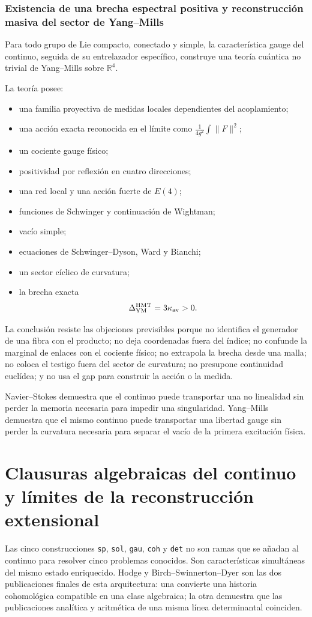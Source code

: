 \subsubsection{Existencia de una brecha espectral positiva y reconstrucción masiva del sector de Yang–Mills}
Para todo grupo de Lie compacto, conectado y simple, la característica gauge
del continuo, seguida de su entrelazador específico, construye una teoría
cuántica no trivial de Yang--Mills sobre \(\mathbb R^4\).\par
La teoría posee:\par
\begin{itemize}
\item una familia proyectiva de medidas locales dependientes del acoplamiento;
\item una acción exacta reconocida en el límite como \(\frac1{4g^2}\int\|F\|^2\);
\item un cociente gauge físico;
\item positividad por reflexión en cuatro direcciones;
\item una red local y una acción fuerte de \(E(4)\);
\item funciones de Schwinger y continuación de Wightman;
\item vacío simple;
\item ecuaciones de Schwinger–Dyson, Ward y Bianchi;
\item un sector cíclico de curvatura;
\item la brecha exacta
  \[
  \Delta_{\rm YM}^{\rm HMT}=3\kappa_{\rm av}>0.
  \]
\end{itemize}
La conclusión resiste las objeciones previsibles porque no identifica el generador de una fibra con el producto; no deja coordenadas fuera del índice; no confunde la marginal de enlaces con el cociente físico; no extrapola la brecha desde una malla; no coloca el testigo fuera del sector de curvatura; no presupone continuidad euclídea; y no usa el gap para construir la acción o la medida.\par
Navier–Stokes demuestra que el continuo puede transportar una no linealidad sin perder la memoria necesaria para impedir una singularidad. Yang–Mills demuestra que el mismo continuo puede transportar una libertad gauge sin perder la curvatura necesaria para separar el vacío de la primera excitación física.\par

\section{Clausuras algebraicas del continuo y límites de la reconstrucción extensional}
Las cinco construcciones \texttt{sp}, \texttt{sol}, \texttt{gau}, \texttt{coh} y \texttt{det} no son ramas que se añadan al continuo para resolver cinco problemas conocidos. Son características simultáneas del mismo estado enriquecido. Hodge y Birch–Swinnerton–Dyer son las dos publicaciones finales de esta arquitectura: una convierte una historia cohomológica compatible en una clase algebraica; la otra demuestra que las publicaciones analítica y aritmética de una misma línea determinantal coinciden.\par
{}
